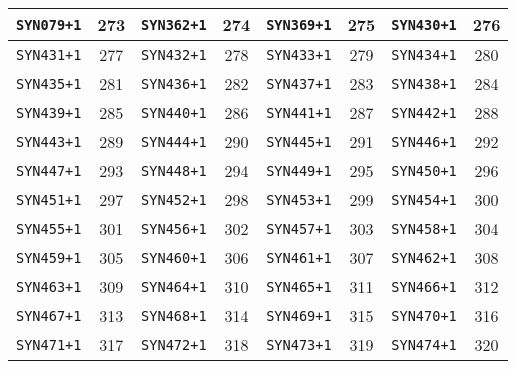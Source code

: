 \documentclass[./main.tex]{subfiles}
\begin{document}
\begin{table}[H]
\begin{tabular}{|c|c|c|c|c|c|c|c|}
\hline
\texttt{SYN079+1} & 273 & \texttt{SYN362+1} & 274 & \texttt{SYN369+1} & 275 & \texttt{SYN430+1} & 276\\
\hline
\texttt{SYN431+1} & 277 & \texttt{SYN432+1} & 278 & \texttt{SYN433+1} & 279 & \texttt{SYN434+1} & 280\\
\hline
\texttt{SYN435+1} & 281 & \texttt{SYN436+1} & 282 & \texttt{SYN437+1} & 283 & \texttt{SYN438+1} & 284\\
\hline
\texttt{SYN439+1} & 285 & \texttt{SYN440+1} & 286 & \texttt{SYN441+1} & 287 & \texttt{SYN442+1} & 288\\
\hline
\texttt{SYN443+1} & 289 & \texttt{SYN444+1} & 290 & \texttt{SYN445+1} & 291 & \texttt{SYN446+1} & 292\\
\hline
\texttt{SYN447+1} & 293 & \texttt{SYN448+1} & 294 & \texttt{SYN449+1} & 295 & \texttt{SYN450+1} & 296\\
\hline
\texttt{SYN451+1} & 297 & \texttt{SYN452+1} & 298 & \texttt{SYN453+1} & 299 & \texttt{SYN454+1} & 300\\
\hline
\texttt{SYN455+1} & 301 & \texttt{SYN456+1} & 302 & \texttt{SYN457+1} & 303 & \texttt{SYN458+1} & 304\\
\hline
\texttt{SYN459+1} & 305 & \texttt{SYN460+1} & 306 & \texttt{SYN461+1} & 307 & \texttt{SYN462+1} & 308\\
\hline
\texttt{SYN463+1} & 309 & \texttt{SYN464+1} & 310 & \texttt{SYN465+1} & 311 & \texttt{SYN466+1} & 312\\
\hline
\texttt{SYN467+1} & 313 & \texttt{SYN468+1} & 314 & \texttt{SYN469+1} & 315 & \texttt{SYN470+1} & 316\\
\hline
\texttt{SYN471+1} & 317 & \texttt{SYN472+1} & 318 & \texttt{SYN473+1} & 319 & \texttt{SYN474+1} & 320\\
\hline
\end{tabular}
\end{table}
\end{document}
